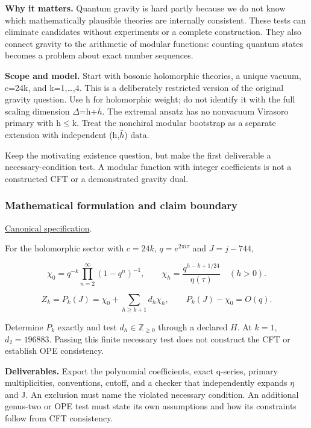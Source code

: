 \documentclass[
  11pt,
]{article}
\begin{document}
\textbf{Why it matters.} Quantum gravity is hard partly because we do
not know which mathematically plausible theories are internally
consistent. These tests can eliminate candidates without experiments or
a complete construction. They also connect gravity to the arithmetic of
modular functions: counting quantum states becomes a problem about exact
number sequences.

\textbf{Scope and model.} Start with bosonic holomorphic theories, a
unique vacuum, c=24k, and k=1,\ldots,4. This is a deliberately
restricted version of the original gravity question. Use h for
holomorphic weight; do not identify it with the full scaling dimension
\ensuremath{\Delta}=h+\ensuremath{\bar{h}}. The extremal ansatz has no
nonvacuum Virasoro primary with h\ensuremath{\le}k. Treat the nonchiral
modular bootstrap as a separate extension with independent
(h,\ensuremath{\bar{h}}) data.

Keep the motivating existence question, but make the first deliverable a
necessary-condition test. A modular function with integer coefficients
is not a constructed CFT or a demonstrated gravity dual.

\subsubsection{Mathematical formulation and claim boundary}

\href{https://github.com/rick-stevens-ai/Pure-Thought/blob/main/PRDs/01-AdS3-Modular-Bootstrap.md}{Canonical
specification}.

For the holomorphic sector with \(c=24k\), \(q=e^{2\pi i\tau}\) and
\(J=j-744\),

\[\chi_0=q^{-k}\prod_{n=2}^{\infty}(1-q^n)^{-1},\qquad
\chi_h=\frac{q^{h-k+1/24}}{\eta(\tau)}\quad(h>0).\]

\[Z_k=P_k(J)=\chi_0+\sum_{h\ge k+1}d_h\chi_h,\qquad
P_k(J)-\chi_0=O(q).\]

Determine \(P_k\) exactly and test \(d_h\in\mathbb Z_{\ge0}\) through a
declared \(H\). At \(k=1\), \(d_2=196883\). Passing this finite
necessary test does not construct the CFT or establish OPE consistency.

\textbf{Deliverables.} Export the polynomial coefficients, exact
q-series, primary multiplicities, conventions, cutoff, and a checker
that independently expands \ensuremath{\eta} and J. An exclusion must
name the violated necessary condition. An additional genus-two or OPE
test must state its own assumptions and how its constraints follow from
CFT consistency.
\end{document}
